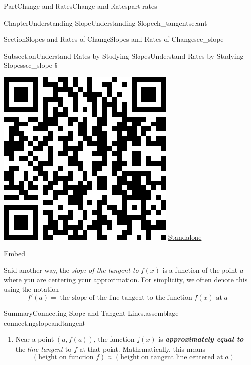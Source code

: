 \documentclass{tufte-book}
\newcommand{\alert}[1]{\textbf{\textit{#1}}}
\numberwithin{equation}{chapter}
\begin{document}
\begin{partptx}{Part}{Change and Rates}{}{Change and Rates}{}{}{part-rates}
\begin{chapterptx}{Chapter}{Understanding Slope}{}{Understanding Slope}{}{}{ch_tangentsecant}
\begin{sectionptx}{Section}{Slopes and Rates of Change}{}{Slopes and Rates of Change}{}{}{sec_slope}
\begin{subsectionptx}{Subsection}{Understand Rates by Studying Slopes}{}{Understand Rates by Studying Slopes}{}{}{sec_slope-6}
\begin{sidebyside}{2}{0.075}{0.075}{0.17}
\begin{sbspanel}{0.21}
\includegraphics[width=\linewidth]{generated/qrcode/sec_slope-6-9.png}
\href{http://webwork.bridgew.edu/oer/functions_at_work/sec_slope-6-9.html}{Standalone}%
\par
\href{http://webwork.bridgew.edu/oer/functions_at_work/sec_slope-6-9-if.html}{Embed}%
\end{sbspanel}%
\end{sidebyside}%
\par
Said another way, the \emph{slope of the tangent to \(f(x)\)} is a function of the point \(a\) where you are centering your approximation. For simplicity, we often denote this using the notation%
\begin{equation*}
f'(a) = \text{ the slope of the line tangent to the function }f(x)\text{ at }a
\end{equation*}
%
\begin{assemblage}{Summary}{Connecting Slope and Tangent Lines.}{assemblage-connectingslopeandtangent}%
%
\begin{enumerate}
\item{}Near a point \((a,f(a))\), the function \(f(x)\) is \alert{approximately equal to} the \emph{line tangent} to \(f\) at that point. Mathematically, this means%
\begin{equation*}
(\text{height on function }f) \approx (\text{height on tangent line centered at } a)

\end{equation*}
\end{enumerate}
\end{assemblage}
\end{subsectionptx}
\end{sectionptx}
\end{chapterptx}
\end{partptx}
\end{document}
